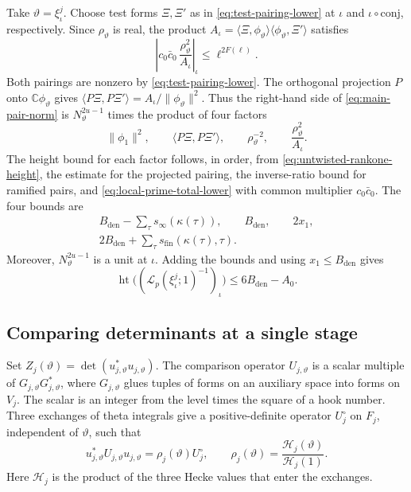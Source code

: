 Take \(\vartheta=\xi_\iota^j\). Choose test forms \(\Xi,\Xi'\)
as in \eqref{eq:test-pairing-lower} at \(\iota\) and
\(\iota\circ\mathrm{conj}\), respectively. Since \(\rho_\vartheta\)
is real, the product
\(A_\iota=\langle\Xi,\phi_\vartheta\rangle\langle\phi_\vartheta,\Xi'\rangle\)
satisfies
\[
 \left|c_0\bar c_0\,\frac{\rho_\vartheta^2}{A_\iota}\right|_\iota
      \le \ell^{2F(\ell)}.
\]
Both pairings are nonzero by \eqref{eq:test-pairing-lower}.
The orthogonal projection \(P\) onto \(\mathbb C\phi_\vartheta\) gives
\(\langle P\Xi,P\Xi'\rangle=A_\iota/\|\phi_\vartheta\|^2\).
Thus the right-hand side of \eqref{eq:main-pair-norm} is \(N_\vartheta^{2u-1}\)
times the product of four factors
\[
 \|\phi_1\|^2,\qquad
 \langle P\Xi,P\Xi'\rangle,\qquad
 \rho_\vartheta^{-2},\qquad
 \frac{\rho_\vartheta^2}{A_\iota}.
\]
The height bound for each factor follows, in order, from
\eqref{eq:untwisted-rankone-height}, the estimate for the projected
pairing, the inverse-ratio bound for ramified pairs, and
\eqref{eq:local-prime-total-lower} with common multiplier \(c_0\bar c_0\).
The four bounds are
\[
 \begin{gathered}
 B_{\mathrm{den}}-\sum_\tau s_\infty(\kappa(\tau)),\qquad
 B_{\mathrm{den}},\qquad 2x_1,\\
 2B_{\mathrm{den}}+\sum_\tau s_{\mathrm{fin}}(\kappa(\tau),\tau).
 \end{gathered}
\]
Moreover, \(N_\vartheta^{2u-1}\) is a unit at \(\iota\).
Adding the bounds and using \(x_1\le B_{\mathrm{den}}\) gives
\begin{equation}
 \operatorname{ht}\bigl(
   (\mathcal L_p(\xi_\iota^j;1)^{-1})_\iota\bigr)
 \le 6B_{\mathrm{den}}-A_0.
 \label{eq:main-pair-height-lower}
\end{equation}



\subsection{Comparing determinants at a single stage}

Set \(Z_j(\vartheta)=\det(u_{j,\vartheta}^*u_{j,\vartheta})\). The
comparison operator \(U_{j,\vartheta}\) is a scalar multiple of
\(G_{j,\vartheta}G_{j,\vartheta}^*\), where \(G_{j,\vartheta}\) glues
tuples of forms on an auxiliary space into forms on \(V_j\). The scalar
is an integer from the level times the square of a hook number.
Three exchanges of theta integrals give a positive-definite operator
\(U_j^\circ\) on \(F_j\), independent of \(\vartheta\), such that
\begin{equation}
 u_{j,\vartheta}^*U_{j,\vartheta}u_{j,\vartheta}
      =\rho_j(\vartheta)U_j^\circ,\qquad
 \rho_j(\vartheta)=
 \frac{\mathcal H_j(\vartheta)}{\mathcal H_j(1)}.
 \label{eq:comparison-operator-lower}
\end{equation}
Here \(\mathcal H_j\) is the product of the three Hecke values that enter
the exchanges.


